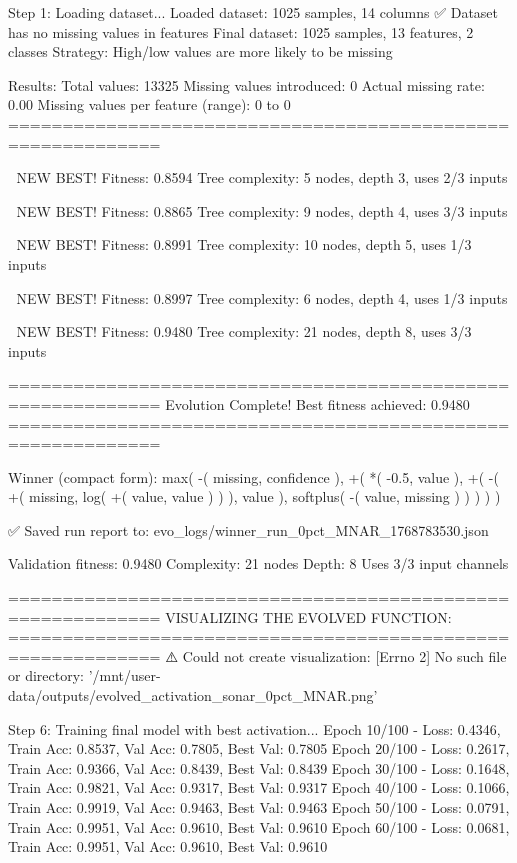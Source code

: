 Step 1: Loading dataset...
Loaded dataset: 1025 samples, 14 columns
✅ Dataset has no missing values in features
Final dataset: 1025 samples, 13 features, 2 classes
Strategy: High/low values are more likely to be missing

Results:
  Total values: 13325
  Missing values introduced: 0
  Actual missing rate: 0.00%
  Missing values per feature (range): 0 to 0
============================================================


🎯 NEW BEST! Fitness: 0.8594
Tree complexity: 5 nodes, depth 3, uses 2/3 inputs

🎯 NEW BEST! Fitness: 0.8865
Tree complexity: 9 nodes, depth 4, uses 3/3 inputs

🎯 NEW BEST! Fitness: 0.8991
Tree complexity: 10 nodes, depth 5, uses 1/3 inputs

🎯 NEW BEST! Fitness: 0.8997
Tree complexity: 6 nodes, depth 4, uses 1/3 inputs

🎯 NEW BEST! Fitness: 0.9480
Tree complexity: 21 nodes, depth 8, uses 3/3 inputs

============================================================
Evolution Complete!
Best fitness achieved: 0.9480
============================================================

Winner (compact form):
 max(
  -(
    missing,
    confidence
  ),
  +(
    *(
      -0.5,
      value
    ),
    +(
      -(
        +(
          missing,
          log(
            +(
              value,
              value
            )
          )
        ),
        value
      ),
      softplus(
        -(
          value,
          missing
        )
      )
    )
  )
)

✅ Saved run report to: evo_logs/winner_run_0pct_MNAR_1768783530.json

Validation fitness: 0.9480
Complexity: 21 nodes
Depth: 8
Uses 3/3 input channels

============================================================
VISUALIZING THE EVOLVED FUNCTION:
============================================================
⚠️ Could not create visualization: [Errno 2] No such file or directory: '/mnt/user-data/outputs/evolved_activation_sonar_0pct_MNAR.png'

Step 6: Training final model with best activation...
Epoch  10/100 - Loss: 0.4346, Train Acc: 0.8537, Val Acc: 0.7805, Best Val: 0.7805
Epoch  20/100 - Loss: 0.2617, Train Acc: 0.9366, Val Acc: 0.8439, Best Val: 0.8439
Epoch  30/100 - Loss: 0.1648, Train Acc: 0.9821, Val Acc: 0.9317, Best Val: 0.9317
Epoch  40/100 - Loss: 0.1066, Train Acc: 0.9919, Val Acc: 0.9463, Best Val: 0.9463
Epoch  50/100 - Loss: 0.0791, Train Acc: 0.9951, Val Acc: 0.9610, Best Val: 0.9610
Epoch  60/100 - Loss: 0.0681, Train Acc: 0.9951, Val Acc: 0.9610, Best Val: 0.9610

